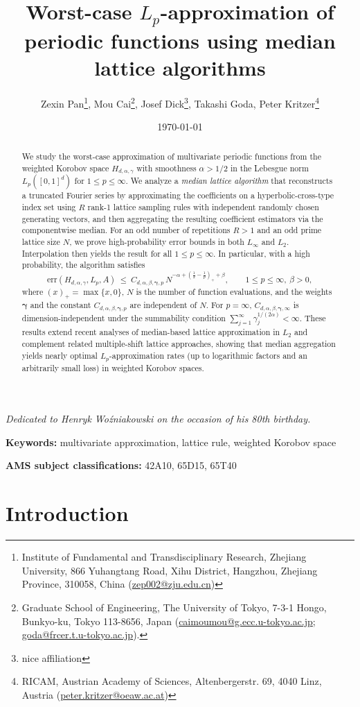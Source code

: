 \documentclass[a4paper,11pt]{article}
\title{Worst-case $L_p$-approximation of periodic functions using median lattice algorithms}
\author{Zexin Pan\thanks{Institute of Fundamental and Transdisciplinary Research, Zhejiang University, 866 Yuhangtang Road, Xihu District, Hangzhou, Zhejiang Province, 310058, China (\url{zep002@zju.edu.cn})}, Mou Cai\thanks{Graduate School of Engineering, The University of Tokyo, 7-3-1 Hongo, Bunkyo-ku, Tokyo 113-8656, Japan (\url{caimoumou@g.ecc.u-tokyo.ac.jp}; \url{goda@frcer.t.u-tokyo.ac.jp}).}, Josef Dick\thanks{nice affiliation}, Takashi Goda\footnotemark[2], Peter Kritzer\thanks{RICAM, Austrian Academy of Sciences, Altenbergerstr. 69, 4040 Linz, Austria (\url{peter.kritzer@oeaw.ac.at})}}
\date{\today}
\providecommand{\keywords}[1]
{
  \noindent \small	
  \textbf{Keywords:} #1
}
\providecommand{\amscode}[1]
{
  \noindent \small	
  \textbf{AMS subject classifications:} #1
}
\newcommand{\bsgamma}{\boldsymbol{\gamma}}
\begin{document}
\maketitle

\sloppy

\centerline{{\it Dedicated to Henryk Wo\'zniakowski on the occasion of his 80th birthday.}}

\begin{abstract}
We study the worst-case approximation of multivariate periodic functions from the weighted Korobov space $H_{d,\alpha,\gamma}$ with smoothness $\alpha>1/2$ in the Lebesgue norm $L_p([0,1]^d)$ for $1\le p\le\infty$. We analyze a \emph{median lattice algorithm} that reconstructs a truncated Fourier series by approximating the coefficients on a hyperbolic-cross-type index set using $R$ rank-1 lattice sampling rules with independent randomly chosen generating vectors, and then aggregating the resulting coefficient estimators via the componentwise median. For an odd number of repetitions $R>1$ and an odd prime lattice size $N$, we prove high-probability error bounds in both $L_\infty$ and $L_2$. Interpolation then yields the result for all $1 \le p\le\infty$. In particular, with a high probability, the algorithm satisfies
\[
\mathrm{err}(H_{d,\alpha,\gamma},L_p,A)\ \le\ C_{d,\alpha,\beta,\bsgamma,p}\, N^{- \alpha + (\frac12 - \frac1p)_+ + \beta },
\qquad 1 \le p\le\infty,\ \beta>0,
\]
where $(x)_+ = \max\{x, 0\}$, $N$ is the number of function evaluations, and the weights $\bsgamma$ and the constant $C_{d,\alpha,\beta,\bsgamma,p}$ are independent of $N$. For $p=\infty$, $C_{d,\alpha,\beta,\bsgamma,\infty}$ is dimension-independent under the summability condition $\sum_{j=1}^\infty \gamma_j^{1/(2\alpha)}<\infty$. These results extend recent analyses of median-based lattice approximation in $L_2$ and complement related multiple-shift lattice approaches, showing that median aggregation yields nearly optimal $L_p$-approximation rates (up to logarithmic factors and an arbitrarily small loss) in weighted Korobov spaces.
\end{abstract}



\keywords{multivariate approximation, lattice rule, weighted Korobov space}

\amscode{42A10, 65D15, 65T40}



\section{Introduction}
\end{document}
